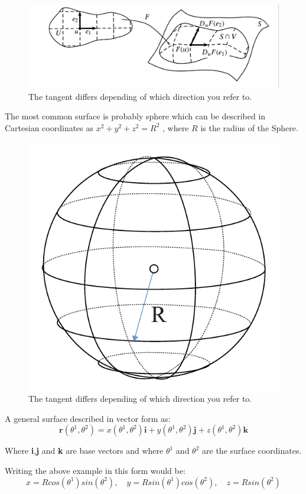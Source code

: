 \begin{figure}[H]
\centering
\includegraphics[width=0.8\linewidth]{figure/Theory/surffunction.pdf}
 
\caption{The tangent differs depending of which direction you refer to. }
\end{figure}




The most common surface is probably sphere which can be described in Cartesian coordinates as $ x^2 + y^2 + z^2 = R^2$ , where $R$ is the radius of the Sphere.

\begin{figure}[H]
\centering
\includegraphics[width=0.4\linewidth ]{figure/Theory/sphereEx.pdf}                \caption{The tangent differs depending of which direction you refer to. }
\end{figure}

A general surface described in vector form as:
\begin{equation}
\textbf{r}(\theta^1,\theta^2) = x(\theta^1,\theta^2)\textbf{i} +  y(\theta^1,\theta^2)\textbf{j}+  z(\theta^1,\theta^2)\textbf{k}
\end{equation}

Where \textbf{i},\textbf{j} and \textbf{k} are base vectors and where $\theta^1$ and $\theta^2$ are the surface coordinates.



Writing the above example in this form would be:
\begin{equation}
x = R cos(\theta^1) sin (\theta^2),\quad
y = R  sin(\theta^1) cos (\theta^2),\quad
z = R sin(\theta^2)
\end{equation}

